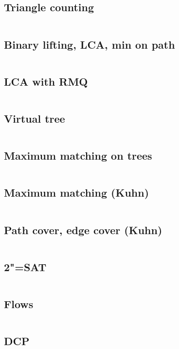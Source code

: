 ﻿\documentclass[10pt,twocolumn,oneside]{article}
\begin{document}
\subsection{Triangle counting}
\inputminted[breaklines]{cpp}{Graph algorithms/triangles.cpp}
\subsection{Binary lifting, LCA, min on path}
\inputminted[breaklines]{cpp}{Graph algorithms/binary lifting + lca + min on path.cpp}
\subsection{LCA with RMQ}
\inputminted[breaklines]{cpp}{Graph algorithms/lca with rmq.cpp}
\subsection{Virtual tree}
\inputminted[breaklines]{cpp}{Graph algorithms/virtual tree.cpp}
\subsection{Maximum matching on trees}
\inputminted[breaklines]{cpp}{Graph algorithms/maximum matching on trees.cpp}
\subsection{Maximum matching (Kuhn)}
\inputminted[breaklines]{cpp}{Graph algorithms/kuhn (with optimizations).cpp}
\subsection{Path cover, edge cover (Kuhn)}
\inputminted[breaklines]{cpp}{Graph algorithms/path cover + edge cover (kuhn).cpp}
\subsection{2"=SAT}
\inputminted[breaklines]{cpp}{Graph algorithms/2-sat.cpp}
\subsection{Flows}
\inputminted[breaklines]{cpp}{Graph algorithms/flows.cpp}
\subsection{DCP}
\inputminted[breaklines]{cpp}{Graph algorithms/dcp.cpp}
\end{document}
